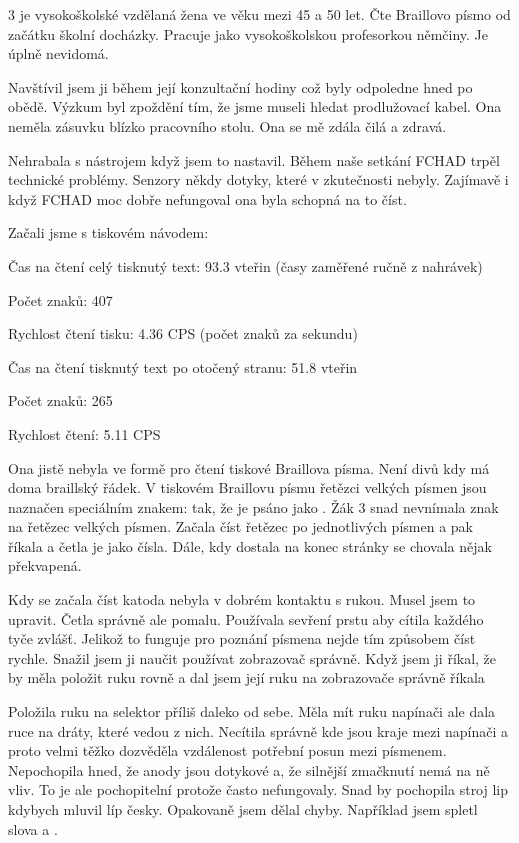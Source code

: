  3 je vysokoškolské vzdělaná žena ve věku mezi 45 a 50 let. Čte Braillovo písmo od začátku školní docházky.  Pracuje jako vysokoškolskou profesorkou němčiny.  Je úplně nevidomá.

Navštívil jsem ji během její konzultační hodiny což byly odpoledne hned po obědě.  Výzkum byl zpoždění tím, že jsme museli hledat prodlužovací kabel. Ona neměla zásuvku blízko pracovního stolu.  Ona se mě zdála čilá a zdravá.

Nehrabala s nástrojem když jsem to nastavil. Během naše setkání FCHAD trpěl technické problémy. Senzory někdy  dotyky, které v zkutečnosti nebyly.  Zajímavě i když FCHAD moc dobře nefungoval ona byla schopná na to číst.

Začali jsme s tiskovém návodem:

Čas na čtení celý tisknutý text: 93.3 vteřin (časy zaměřené ručně z nahrávek)

Počet znaků: 407

Rychlost čtení tisku: 4.36 CPS (počet znaků za sekundu)

Čas na čtení tisknutý text po otočený stranu: 51.8 vteřin

Počet znaků: 265

Rychlost čtení: 5.11 CPS

Ona jistě nebyla ve formě pro čtení tiskové Braillova písma.  Není divů kdy má doma braillský řádek.  V tiskovém Braillovu písmu řetězci velkých písmen jsou naznačen speciálním znakem:  tak, že  je psáno jako . Žák 3 snad nevnímala znak na řetězec velkých písmen.  Začala číst řetězec po jednotlivých písmen a pak říkala  a četla je jako čísla.  Dále, kdy dostala na konec stránky se chovala nějak překvapená.

Kdy se začala číst katoda nebyla v dobrém kontaktu s rukou.  Musel jsem to upravit.  Četla správně ale pomalu. Používala sevření prstu aby cítila každého tyče zvlášť.  Jelikož to funguje pro poznání písmena nejde tím způsobem číst rychle. Snažil jsem ji naučit používat zobrazovač správně.  Když jsem ji říkal, že by měla položit ruku rovně a dal jsem její ruku na zobrazovače správně říkala  %

Položila ruku na selektor příliš daleko od sebe. Měla mít ruku napínači ale dala ruce na dráty, které vedou z nich.  Necítila správně kde jsou kraje mezi napínači a proto velmi těžko dozvěděla vzdálenost potřební posun mezi písmenem.  Nepochopila hned, že anody jsou dotykové a, že silnější zmačknutí nemá na ně vliv.  To je ale pochopitelní protože často nefungovaly. Snad by pochopila stroj lip kdybych mluvil líp česky.  Opakovaně jsem dělal chyby. Například jsem spletl slova  a .

